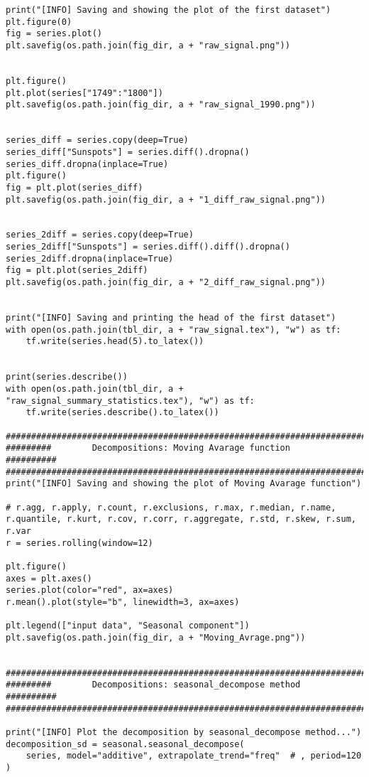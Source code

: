 \documentclass[12pt]{article}
\begin{document}
\begin{lstlisting}
print("[INFO] Saving and showing the plot of the first dataset")
plt.figure(0)
fig = series.plot()
plt.savefig(os.path.join(fig_dir, a + "raw_signal.png"))


plt.figure()
plt.plot(series["1749":"1800"])
plt.savefig(os.path.join(fig_dir, a + "raw_signal_1990.png"))


series_diff = series.copy(deep=True)
series_diff["Sunspots"] = series.diff().dropna()
series_diff.dropna(inplace=True)
plt.figure()
fig = plt.plot(series_diff)
plt.savefig(os.path.join(fig_dir, a + "1_diff_raw_signal.png"))


series_2diff = series.copy(deep=True)
series_2diff["Sunspots"] = series.diff().diff().dropna()
series_2diff.dropna(inplace=True)
fig = plt.plot(series_2diff)
plt.savefig(os.path.join(fig_dir, a + "2_diff_raw_signal.png"))


print("[INFO] Saving and printing the head of the first dataset")
with open(os.path.join(tbl_dir, a + "raw_signal.tex"), "w") as tf:
    tf.write(series.head(5).to_latex())


print(series.describe())
with open(os.path.join(tbl_dir, a + "raw_signal_summary_statistics.tex"), "w") as tf:
    tf.write(series.describe().to_latex())

############################################################################
#########        Decompositions: Moving Avarage function          ##########
############################################################################
print("[INFO] Saving and showing the plot of Moving Avarage function")

# r.agg, r.apply, r.count, r.exclusions, r.max, r.median, r.name, r.quantile, r.kurt, r.cov, r.corr, r.aggregate, r.std, r.skew, r.sum, r.var
r = series.rolling(window=12)

plt.figure()
axes = plt.axes()
series.plot(color="red", ax=axes)
r.mean().plot(style="b", linewidth=3, ax=axes)

plt.legend(["input data", "Seasonal component"])
plt.savefig(os.path.join(fig_dir, a + "Moving_Avrage.png"))


############################################################################
#########        Decompositions: seasonal_decompose method        ##########
############################################################################

print("[INFO] Plot the decomposition by seasonal_decompose method...")
decomposition_sd = seasonal.seasonal_decompose(
    series, model="additive", extrapolate_trend="freq"  # , period=120
)


\end{lstlisting}
\end{document}

